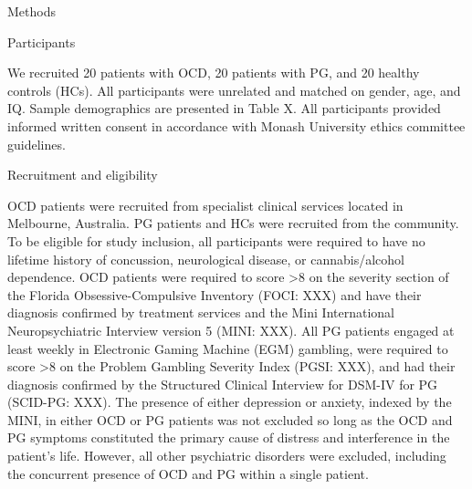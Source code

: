 Methods

Participants

We recruited 20 patients with OCD, 20 patients with PG, and 20 healthy controls (HCs). All participants were unrelated and matched on gender, age, and IQ. Sample demographics are presented in Table X. All participants provided informed written consent in accordance with Monash University ethics committee guidelines.

Recruitment and eligibility

OCD patients were recruited from specialist clinical services located in Melbourne, Australia. PG patients and HCs were recruited from the community. To be eligible for study inclusion, all participants were required to have no lifetime history of concussion, neurological disease, or cannabis/alcohol dependence. OCD patients were required to score >8 on the severity section of the Florida Obsessive-Compulsive Inventory (FOCI: XXX) and have their diagnosis confirmed by treatment services and the Mini International Neuropsychiatric Interview version 5 (MINI: XXX). All PG patients engaged at least weekly in Electronic Gaming Machine (EGM) gambling, were required to score >8 on the Problem Gambling Severity Index (PGSI: XXX), and had their diagnosis confirmed by the Structured Clinical Interview for DSM-IV for PG (SCID-PG: XXX). The presence of either depression or anxiety, indexed by the MINI, in either OCD or PG patients was not excluded so long as the OCD and PG symptoms constituted the primary cause of distress and interference in the patient’s life. However, all other psychiatric disorders were excluded, including the concurrent presence of OCD and PG within a single patient.
